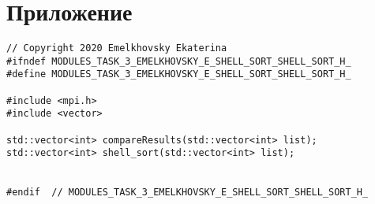 \documentclass{report}
\begin{document}
\section*{Приложение}
\begin{lstlisting}
// Copyright 2020 Emelkhovsky Ekaterina
#ifndef MODULES_TASK_3_EMELKHOVSKY_E_SHELL_SORT_SHELL_SORT_H_
#define MODULES_TASK_3_EMELKHOVSKY_E_SHELL_SORT_SHELL_SORT_H_

#include <mpi.h>
#include <vector>

std::vector<int> compareResults(std::vector<int> list);
std::vector<int> shell_sort(std::vector<int> list);


#endif  // MODULES_TASK_3_EMELKHOVSKY_E_SHELL_SORT_SHELL_SORT_H_


\end{lstlisting}
\end{document}
